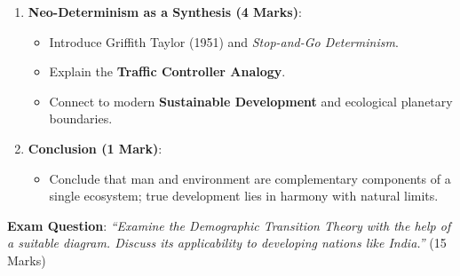 \documentclass[11pt,a4paper]{article}
\begin{document}
\begin{enumerate}[leftmargin=*]
  \item \textbf{Neo-Determinism as a Synthesis (4 Marks)}:
  \begin{itemize}
    \item Introduce Griffith Taylor (1951) and \textit{Stop-and-Go Determinism}.
    \item Explain the \textbf{Traffic Controller Analogy}.
    \item Connect to modern \textbf{Sustainable Development} and ecological planetary boundaries.
  \end{itemize}

  \item \textbf{Conclusion (1 Mark)}:
  \begin{itemize}
    \item Conclude that man and environment are complementary components of a single ecosystem; true development lies in harmony with natural limits.
  \end{itemize}
\end{enumerate}

\begin{exambox}
\textbf{Exam Question}: \textit{``Examine the Demographic Transition Theory with the help of a suitable diagram. Discuss its applicability to developing nations like India.''} (15 Marks)
\end{exambox}
\end{document}
